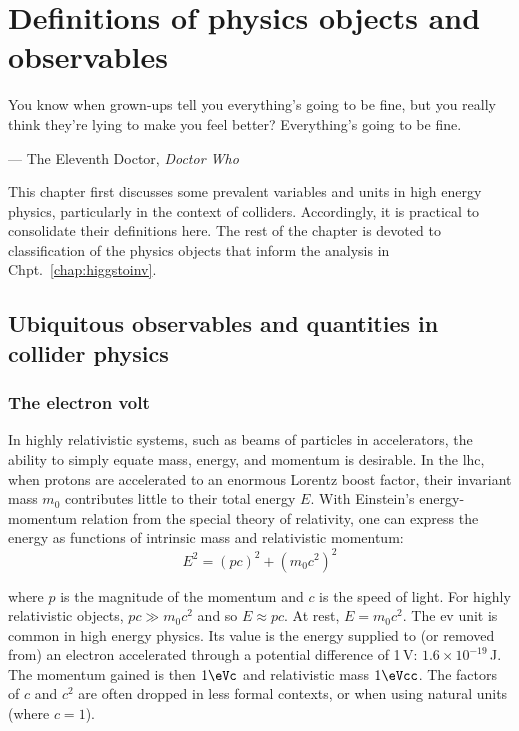 \chapter{Definitions of physics objects and observables}
\label{chap:objects}


\epigraph{You know when grown-ups tell you everything’s going to be fine, but you really think they’re lying to make you feel better? Everything’s going to be fine.}{--- The Eleventh Doctor, \emph{Doctor Who}}

This chapter first discusses some prevalent variables and units in high energy physics, particularly in the context of colliders. Accordingly, it is practical to consolidate their definitions here. The rest of the chapter is devoted to classification of the physics objects that inform the analysis in Chpt.~\ref{chap:higgstoinv}.




\section{Ubiquitous observables and quantities in collider physics}
\label{sec:objects_important_observables}




\subsection{The electron volt}
\label{subsec:objects_electron_volt}

In highly relativistic systems, such as beams of particles in accelerators, the ability to simply equate mass, energy, and momentum is desirable. In the \acrshort{lhc}, when protons are accelerated to an enormous Lorentz boost factor, their invariant mass $m_0$ contributes little to their total energy $E$. With Einstein's energy-momentum relation from the special theory of relativity, one can express the energy as functions of intrinsic mass and relativistic momentum:
\begin{equation}
    E^2 = (pc)^2 + (m_0c^2)^2
    \label{eq:e_mc2}
\end{equation}

where $p$ is the magnitude of the momentum and $c$ is the speed of light. For highly relativistic objects, $pc \gg m_0c^2$ and so $E \approx pc$. At rest, $E = m_0c^2$. The \acrfull{ev} unit is common in high energy physics. Its value is the energy supplied to (or removed from) an electron accelerated through a potential difference of 1\,V: $\text{1.6}\times \text{10}^{-19}$\,J. The momentum gained is then $\text{1}\eVc$ and relativistic mass $\text{1}\eVcc$. The factors of $c$ and $c^2$ are often dropped in less formal contexts, or when using natural units (where $c = \text{1}$).

